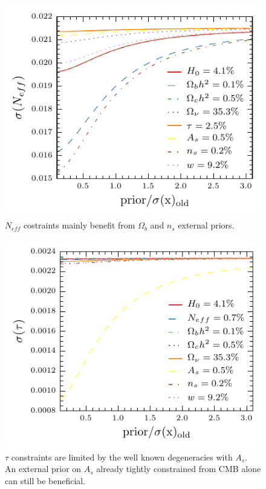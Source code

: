 \documentclass[aps,prd,reprint,superscriptaddress]{revtex4-1}
\begin{document}
\begin{figure}[htbp]
\begin{center}
\includegraphics{prior_massless_neutrinos_snow_mass.pdf}
\caption{$N_{eff}$ costraints mainly benefit from $\Omega_{b}$ and $n_{s}$ external priors.}
\label{fig:prior_massless_neutrinos}
\end{center}
\end{figure}


\begin{figure}[htbp]
\begin{center}
\includegraphics{prior_re_optical_depth_snow_mass.pdf}
\caption{$\tau$ constraints are limited by the well known degeneracies with $A_{s}$. An external prior on $A_{s}$ already tightly constrained from CMB alone can still be beneficial. }
\label{fig:prior_re_optical_depth}
\end{center}
\end{figure}
\end{document}
